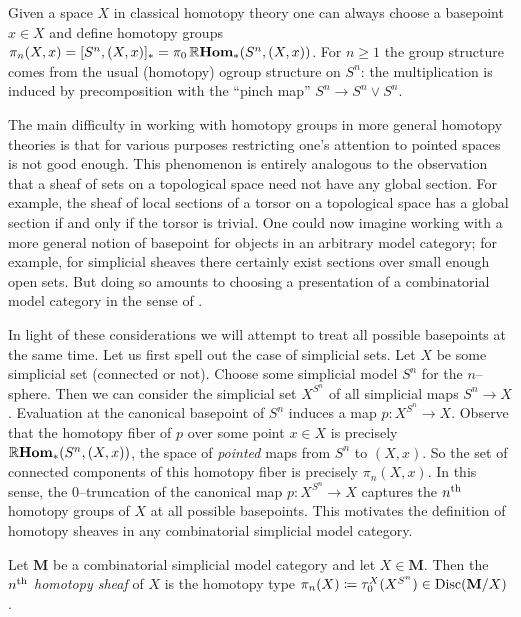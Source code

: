 Given a space \(X\) in classical homotopy theory one can always choose a basepoint \(x\in X\) and define homotopy groups \(\pi_{n}(X,x) = [S^{n}, (X,x)]_{*} = \pi_{0}\operatorname{\mathbb{R}\textnormal{\bfseries Hom}}_{*}(S^{n}, (X,x))\). For \(n\geq 1\) the group structure comes from the usual (homotopy) ogroup structure on \(S^{n}\): the multiplication is induced by precomposition with the \enquote{pinch map} \(S^{n}\to S^{n}\vee S^{n}\).

The main difficulty in working with homotopy groups in more general homotopy theories is that for various purposes restricting one's attention to pointed spaces is not good enough. This phenomenon is entirely analogous to the observation that a sheaf of sets on a topological space need not have any global section. For example, the sheaf of local sections of a torsor on a topological space has a global section if and only if the torsor is trivial. One could now imagine working with a more general notion of basepoint for objects in an arbitrary model category; for example, for simplicial sheaves there certainly exist sections over small enough open sets. But doing so amounts to choosing a presentation of a combinatorial model category in the sense of \cite{mr1870516}.

In light of these considerations we will attempt to treat all possible basepoints at the same time. Let us first spell out the case of simplicial sets. Let \(X\) be some simplicial set (connected or not). Choose some simplicial model \(S^{n}\) for the \(n\)--sphere. Then we can consider the simplicial set \(X^{S^{n}}\) of all simplicial maps \(S^{n}\to X\). Evaluation at the canonical basepoint of \(S^{n}\) induces a map \(p\colon X^{S^{n}}\to X\). Observe that the homotopy fiber of \(p\) over some point \(x\in X\) is precisely \(\operatorname{\mathbb{R}\textnormal{\bfseries Hom}}_{*}(S^{n}, (X,x))\), the space of \emph{pointed} maps from \(S^{n}\) to \((X,x)\). So the set of connected components of this homotopy fiber is precisely \(\pi_{n}(X,x)\). In this sense, the \(0\)--truncation of the canonical map \(p\colon X^{S^{n}}\to X\) captures the \(n\textsuperscript{th}\) homotopy groups of \(X\) at all possible basepoints. This motivates the definition of homotopy sheaves in any combinatorial simplicial model category.

\begin{definition}
  Let \(\mathbf M\) be a combinatorial simplicial model category and let \(X\in\mathbf M\). Then the \emph{\(n\textsuperscript{th}\) homotopy sheaf} of \(X\) is the homotopy type \(\pi_{n}(X)\coloneqq\tau_{0}^{X}(X^{S^{n}})\in\operatorname{\textnormal{Disc}}(\mathbf M/X)\).
\end{definition}

